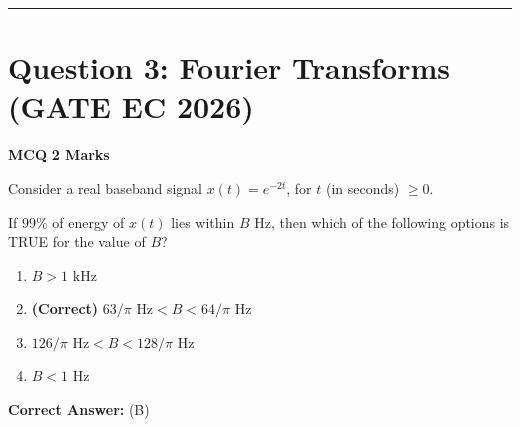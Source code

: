 \documentclass[11pt,a4paper]{article}
\begin{document}
\vspace{1.5em}
\hrule
\vspace{1.5em}

\section*{Question 3: Fourier Transforms (GATE EC 2026)}
\noindent \textbf{\color{primary}MCQ} \hfill \textbf{\color{secondary}2 Marks}


\noindent Consider a real baseband signal $x(t) = e^{-2t}$, for $t$ (in seconds) $\ge 0$. 

If $99\%$ of energy of $x(t)$ lies within $B \text{ Hz}$, then which of the following options is TRUE for the value of $B$?


\begin{enumerate}[label=(\Alph*)]
    \item $B > 1 \text{ kHz}$
    \item \textbf{(Correct)} $63/\pi \text{ Hz} < B < 64/\pi \text{ Hz}$
    \item $126/\pi \text{ Hz} < B < 128/\pi \text{ Hz}$
    \item $B < 1 \text{ Hz}$
\end{enumerate}

\noindent \textbf{Correct Answer:} (B)
\end{document}
